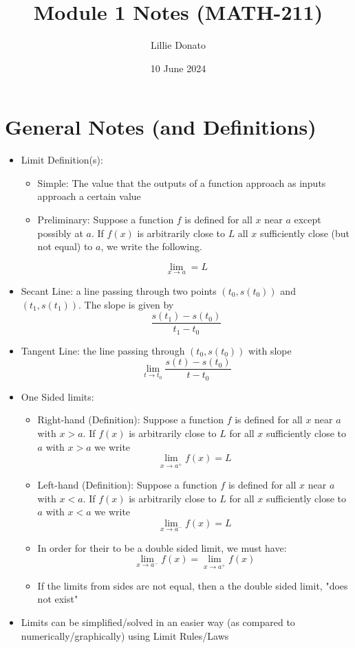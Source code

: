 \documentclass{article}
\title{Module 1 Notes (MATH-211)}
\author{Lillie Donato}
\date{10 June 2024}
\begin{document}
\maketitle

\section*{General Notes (and Definitions)}
\begin{itemize}
    \item Limit Definition(s):
        \begin{itemize}
            \item Simple: The value that the outputs of a function approach as inputs approach a certain value
            \item Preliminary: Suppose a function $f$ is defined for all $x$ near $a$ except possibly at $a$. If $f(x)$ is arbitrarily close to $L$ all $x$ sufficiently close (but not equal) to $a$, we write the following.
        \end{itemize}
        $$\lim_{x \to a}=L$$
    \item Secant Line: a line passing through two points $(t_0, s(t_0))$ and $(t_1, s(t_1))$. The slope is given by
    $$\frac{s(t_1)-s(t_0)}{t_1-t_0}$$
    \item Tangent Line: the line passing through $(t_0, s(t_0))$ with slope $$\lim_{t \to t_0}\frac{s(t)-s(t_0)}{t-t_0}$$
    \item One Sided limits:
        \begin{itemize}
            \item Right-hand (Definition): Suppose a function $f$ is defined for all $x$ near $a$ with $x > a$. If $f(x)$ is arbitrarily close to $L$ for all $x$ sufficiently close to $a$ with $x > a$ we write
            $$\lim_{x \to a^+}{f(x) = L}$$
            \item Left-hand (Definition): Suppose a function $f$ is defined for all $x$ near $a$ with $x < a$. If $f(x)$ is arbitrarily close to $L$ for all $x$ sufficiently close to $a$ with $x < a$ we write
            $$\lim_{x \to a^-}{f(x) = L}$$
            \item In order for their to be a double sided limit, we must have:
            $$\lim_{x \to a^-}{f(x)} = \lim_{x \to a^+}{f(x)}$$
            \item If the limits from sides are not equal, then a the double sided limit, "does not exist"
        \end{itemize}
    \item Limits can be simplified/solved in an easier way (as compared to numerically/graphically) using Limit Rules/Laws

\end{itemize}
\end{document}

